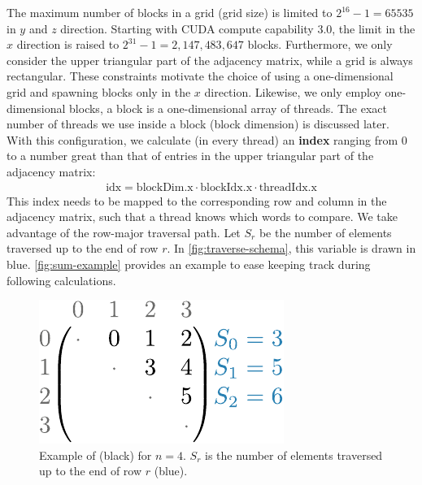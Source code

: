 The maximum number of blocks in a grid (grid size) is limited to $2^{16} - 1 = 65535$ in $y$ and $z$ direction. Starting with CUDA compute capability 3.0, the limit in the $x$ direction is raised to $2^{31} - 1 = 2,147,483,647$ blocks. Furthermore, we only consider the upper triangular part of the adjacency matrix, while a grid is always rectangular. These constraints motivate the choice of using a one-dimensional grid and spawning blocks only in the $x$ direction. Likewise, we only employ one-dimensional blocks, \ie a block is a one-dimensional array of threads. The exact number of threads we use inside a block (block dimension) is discussed later. With this configuration, we calculate (in every thread) an \textbf{index} ranging from $0$ to a number great than that of entries in the upper triangular part of the adjacency matrix:
\begin{align}
    \text{idx} = \text{blockDim.x} \cdot \text{blockIdx.x} \cdot \text{threadIdx.x}
\end{align}
This index needs to be mapped to the corresponding row and column in the adjacency matrix, such that a thread knows which words to compare. We take advantage of the row-major traversal path. Let $S_r$ be the number of elements traversed up to the end of row $r$. In \autoref{fig:traverse-schema}, this variable is drawn in blue. \autoref{fig:sum-example} provides an example to ease keeping track during following calculations.

\begin{figure}[H]
    \centering
    \includegraphics[width=0.5\linewidth]{assets/illustrator/sum-example.pdf}
    \caption{Example of  (black) for $n=4$. $S_r$ is the number of elements traversed up to the end of row $r$ (blue).}
    \label{fig:sum-example}
\end{figure}

\vspace{-3em}

